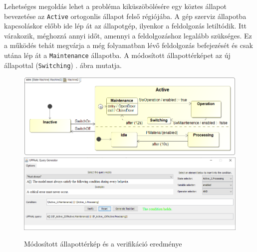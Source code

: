 Lehetséges megoldás lehet a probléma kiküszöbölésére egy köztes állapot bevezetése az \verb+Active+ ortogonlis állapot felső régiójába. A gép szerviz állapotba kapcsoláskor előbb ide lép át az állapotgép, ilyenkor a feldolgozás letiltódik. Itt várakozik, méghozzá annyi időt, amennyi a feldolgozáshoz legalább szükséges. Ez a működés tehát megvárja a még folyamatban lévő feldolgozás befejezését és csak utána lép át a \verb+Maintenance+ állapotba. A módosított állapottérképet az új állapottal (\verb+Switching+) . ábra mutatja.
\begin{figure}[H]
	\centering
	\includegraphics[keepaspectratio, width=150mm]{figures/machine2.png}
	\includegraphics[keepaspectratio, width=150mm]{figures/fixed-result.png}
	\caption{Módosított állapottérkép és a verifikáció eredménye}
	\label{fig:machine2}
\end{figure}










